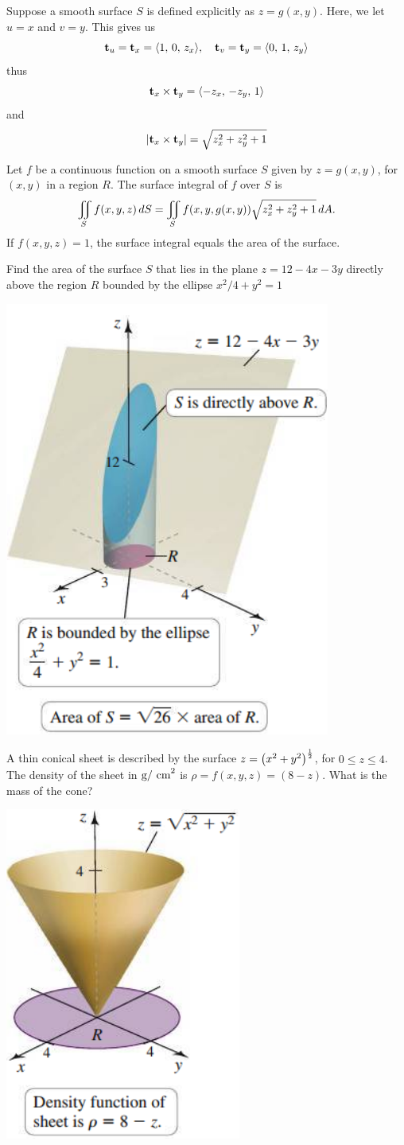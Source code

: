 \documentclass[../mathNotesPreamble]{subfiles}
\begin{document}
  Suppose a smooth surface $S$ is defined explicitly as $z=g(x,y)$. Here, we let $u=x$ and $v=y$. This gives us
    \[\mathbf t_u=\mathbf t_x={\left\langle 1,\,0,\,z_x \right\rangle},\quad \mathbf t_v=\mathbf t_y={\left\langle 0,\,1,\,z_y \right\rangle}\]
  thus
    \[\mathbf t_x\times\mathbf t_y={\left\langle -z_x,\,-z_y,\,1 \right\rangle}\]
  and
    \[{\left\vert\mathbf t_x\times\mathbf t_y\right\vert}=\sqrt{z^2_x+z^2_y+1}\]

  \begin{thmBox*}
    Let $f$ be a continuous function on a smooth surface $S$ given by $z=g(x,y)$, for $(x,y)$ in a region $R$. The surface integral of $f$ over $S$ is
      \[\iint\limits_S f(x,y,z)\,dS=\iint\limits_S f{\left(x,y,g(x,y)\right)}\sqrt{z_x^2+z_y^2+1}\,dA.\]
    If $f(x,y,z)=1$, the surface integral equals the area of the surface.
  \end{thmBox*}
  \pagebreak

  \begin{ex*}
    Find the area of the surface $S$ that lies in the plane $z=12-4x-3y$ directly above the region $R$ bounded by the ellipse $x^2/4+y^2=1$
  \end{ex*}
  \begin{flushright}
    \includegraphics[width=0.3\linewidth]{../images/briggs_17_06/fig17_53}
  \end{flushright}
  \pagebreak

  \begin{ex*}
    A thin conical sheet is described by the surface $z={\left(x^2+y^2\right)}^{\frac{1}{2}}$, for $0\leq z\leq 4$. The density of the sheet in $\textnormal{g/ cm}^2$ is $\rho=f(x,y,z)=(8-z)$. What is the mass of the cone?
  \end{ex*}
  \begin{flushright}
    \includegraphics[width=0.25\linewidth]{../images/briggs_17_06/fig17_54}
  \end{flushright}
  \pagebreak
\end{document}
